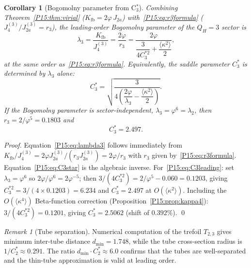 \documentclass[11pt,a4paper]{article}
\newtheorem{corollary}[theorem]{Corollary}
\theoremstyle{definition}\newtheorem{definition}[theorem]{Definition}
\theoremstyle{remark}
\newtheorem{remark}[theorem]{Remark}
\newcommand{\vp}{\varphi}
\newcommand{\lam}{\lambda}
\newcommand{\Ja}{J_{2a}}
\newcommand{\Kfb}{K_{\mathrm{fb}}}
\newcommand{\QH}{Q_H}
\begin{document}
\begin{corollary}[Bogomolny parameter from C$_3^*$]
\label{P15:cor:lambda3}
Combining Theorem~\ref{P15:thm:virial} ($\Kfb=2\vp\,\Ja$)
with~\eqref{P15:eq:r3formula} ($J_4^{(3)}/\Ja^{(3)}=r_3$), the
leading-order Bogomolny parameter of the $\QH=3$ sector is
\begin{equation}
  \boxed{\lam_3
  = \frac{\Kfb}{J_4^{(3)}}
  = \frac{2\vp}{r_3}
  = \frac{2\vp}{\dfrac{3}{4C_3^{*2}}+\dfrac{\langle\kappa^2\rangle}{2}},}
  \label{P15:eq:lambda3}
\end{equation}
at the same order as~\eqref{P15:eq:r3formula}.
Equivalently, the saddle parameter $C_3^*$ is determined by
$\lam_3$ alone:
\begin{equation}
  C_3^* = \sqrt{\frac{3}{4\!\left(\dfrac{2\vp}{\lam_3}-\dfrac{\langle\kappa^2\rangle}{2}\right)}}.
  \label{P15:eq:C3star}
\end{equation}
If the Bogomolny parameter is sector-independent,
$\lam_3=\vp^6=\lam_2$, then $r_3=2/\vp^5=0.1803$ and
\begin{equation}
  C_3^* = 2.497.
  \label{P15:eq:C3leading}
\end{equation}
\end{corollary}

\begin{proof}
Equation~\eqref{P15:eq:lambda3} follows immediately from
$\Kfb/J_4^{(3)} = 2\vp\Ja^{(3)}/(r_3\Ja^{(3)}) = 2\vp/r_3$
with $r_3$ given by~\eqref{P15:eq:r3formula}.
Equation~\eqref{P15:eq:C3star} is the algebraic inverse.
For~\eqref{P15:eq:C3leading}: set $\lam_3=\vp^6$ so $2\vp/\vp^6=2\vp^{-5}$;
then $3/(4C_3^{*2})=2/\vp^5-0.060=0.1203$, giving
$C_3^{*2}=3/(4\times0.1203)=6.234$ and $C_3^*=2.497$ at $O(\langle\kappa^2\rangle)$.
Including the $O(\langle\kappa^4\rangle)$ Beta-function correction
(Proposition~\ref{P15:prop:kappa4}): $3/(4C_3^{*2})=0.1201$,
giving $C_3^*=2.5062$ (shift of $0.392\%$).
\qed
\end{proof}



\begin{remark}[Tube separation]
\label{P15:rem:tube_separation}
Numerical computation of the trefoil $T_{2,3}$ gives minimum
inter-tube distance $d_{\min}=1.748$, while the tube
cross-section radius is $1/C^*_2\approx0.291$.
The ratio $d_{\min}\cdot C^*_2\approx 6.0$ confirms that the
tubes are well-separated and the thin-tube approximation is valid
at leading order.
\end{remark}

\end{document}
